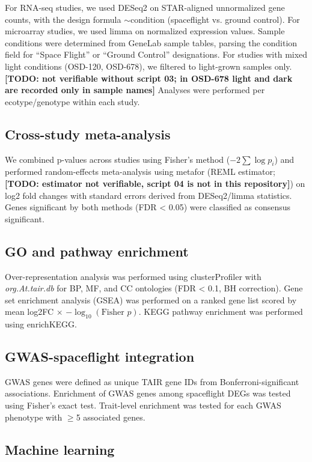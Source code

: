 \documentclass[sn-mathphys-num,Basic]{sn-jnl}
\begin{document}
For RNA-seq studies, we used DESeq2 on STAR-aligned unnormalized gene counts, with the design formula $\sim \text{condition}$ (spaceflight vs. ground control). For microarray studies, we used limma on normalized expression values. Sample conditions were determined from GeneLab sample tables, parsing the condition field for ``Space Flight'' or ``Ground Control'' designations. For studies with mixed light conditions (OSD-120, OSD-678), we filtered to light-grown samples only. \textbf{[TODO: not verifiable without script 03; in OSD-678 light and dark are recorded only in sample names]} Analyses were performed per ecotype/genotype within each study.

\subsection{Cross-study meta-analysis}

We combined p-values across studies using Fisher's method ($-2\sum \log p_i$) and performed random-effects meta-analysis using metafor (REML estimator; \textbf{[TODO: estimator not verifiable, script 04 is not in this repository]}) on log2 fold changes with standard errors derived from DESeq2/limma statistics. Genes significant by both methods (FDR < 0.05) were classified as consensus significant.

\subsection{GO and pathway enrichment}

Over-representation analysis was performed using clusterProfiler with \textit{org.At.tair.db} for BP, MF, and CC ontologies (FDR < 0.1, BH correction). Gene set enrichment analysis (GSEA) was performed on a ranked gene list scored by mean log2FC $\times$ $-\log_{10}(\text{Fisher } p)$. KEGG pathway enrichment was performed using enrichKEGG.

\subsection{GWAS-spaceflight integration}

GWAS genes were defined as unique TAIR gene IDs from Bonferroni-significant associations. Enrichment of GWAS genes among spaceflight DEGs was tested using Fisher's exact test. Trait-level enrichment was tested for each GWAS phenotype with $\geq$5 associated genes.

\subsection{Machine learning}
\end{document}
